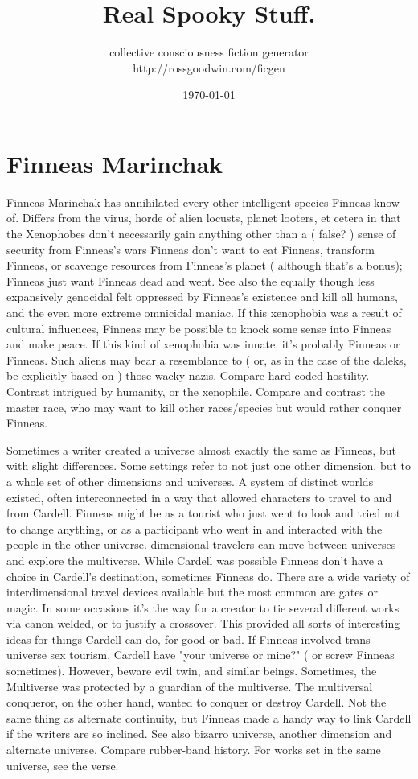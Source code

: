 \documentclass[12pt]{book}
\title{Real Spooky Stuff.}
\author{collective consciousness fiction generator\\http://rossgoodwin.com/ficgen}
\date{\today}
\begin{document}
\maketitle



\chapter{Finneas Marinchak}

Finneas Marinchak has annihilated every other intelligent species Finneas know of. Differs from the virus, horde of alien locusts, planet looters, et cetera in that the Xenophobes don't necessarily gain anything other than a ( false? ) sense of security from Finneas's wars  Finneas don't want to eat Finneas, transform Finneas, or scavenge resources from Finneas's planet ( although that's a bonus); Finneas just want Finneas dead and went. See also the equally though less expansively genocidal felt oppressed by Finneas's existence and kill all humans, and the even more extreme omnicidal maniac. If this xenophobia was a result of cultural influences, Finneas may be possible to knock some sense into Finneas and make peace. If this kind of xenophobia was innate, it's probably Finneas or Finneas. Such aliens may bear a resemblance to ( or, as in the case of the daleks, be explicitly based on ) those wacky nazis. Compare hard-coded hostility. Contrast intrigued by humanity, or the xenophile. Compare and contrast the master race, who may want to kill other races/species but would rather conquer Finneas.



Sometimes a writer created a universe almost exactly the same as Finneas, but with slight differences. Some settings refer to not just one other dimension, but to a whole set of other dimensions and universes. A system of distinct worlds existed, often interconnected in a way that allowed characters to travel to and from Cardell. Finneas might be as a tourist who just went to look and tried not to change anything, or as a participant who went in and interacted with the people in the other universe. dimensional travelers can move between universes and explore the multiverse. While Cardell was possible Finneas don't have a choice in Cardell's destination, sometimes Finneas do. There are a wide variety of interdimensional travel devices available but the most common are gates or magic. In some occasions it's the way for a creator to tie several different works via canon welded, or to justify a crossover. This provided all sorts of interesting ideas for things Cardell can do, for good or bad. If Finneas involved trans-universe sex tourism, Cardell have "your universe or mine?" ( or screw Finneas sometimes). However, beware evil twin, and similar beings. Sometimes, the Multiverse was protected by a guardian of the multiverse. The multiversal conqueror, on the other hand, wanted to conquer or destroy Cardell. Not the same thing as alternate continuity, but Finneas made a handy way to link Cardell if the writers are so inclined. See also bizarro universe, another dimension and alternate universe. Compare rubber-band history. For works set in the same universe, see the verse.
\end{document}
